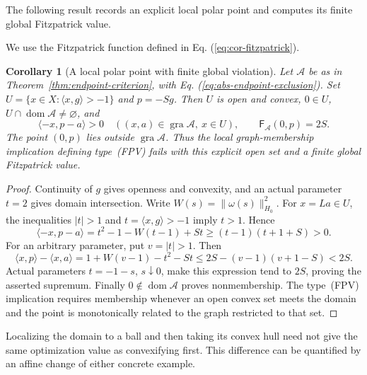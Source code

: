\documentclass[11pt]{article}
\newcommand{\gra}{\operatorname{gra}}
\newcommand{\dom}{\operatorname{dom}}
\newcommand{\pair}[2]{\langle #1,#2\rangle}
\newtheorem{corollary}{Corollary}
\theoremstyle{definition}
\theoremstyle{remark}
\begin{document}
The following result records an explicit local polar point and computes its finite global Fitzpatrick value.

We use the Fitzpatrick function defined in Eq. (\ref{eq:cor-fitzpatrick}).

\begin{corollary}[A local polar point with finite global violation]
\label{cor:local-polar-recovered}
Let $\mathcal A$ be as in Theorem~\ref{thm:endpoint-criterion}, with Eq. (\ref{eq:abs-endpoint-exclusion}). Set $U=\{x\in X:\pair{x}{g}>-1\}$ and $p=-Sg$. Then $U$ is open and convex, $0\in U$, $U\cap\dom\mathcal A\ne\varnothing$, and
\[
\pair{-x}{p-a}>0\quad((x,a)\in\gra\mathcal A,\ x\in U),
\qquad \mathsf F_{\mathcal A}(0,p)=2S.
\]
The point $(0,p)$ lies outside $\gra\mathcal A$. Thus the local graph-membership implication defining type~(FPV) fails with this explicit open set and a finite global Fitzpatrick value.
\end{corollary}
\begin{proof}
Continuity of $g$ gives openness and convexity, and an actual parameter $t=2$ gives domain intersection. Write $W(s)=\|\omega(s)\|_{H_0}^2$. For $x=La\in U$, the inequalities $|t|>1$ and $t=\pair{x}{g}>-1$ imply $t>1$. Hence
\[
\pair{-x}{p-a}=t^2-1-W(t-1)+St
\ge(t-1)(t+1+S)>0.
\]
For an arbitrary parameter, put $v=|t|>1$. Then
\[
\pair{x}{p}-\pair{x}{a}
=1+W(v-1)-t^2-St
\le2S-(v-1)(v+1-S)<2S.
\]
Actual parameters $t=-1-s$, $s\downarrow0$, make this expression tend to $2S$, proving the asserted supremum. Finally $0\notin\dom\mathcal A$ proves nonmembership. The type~(FPV) implication requires membership whenever an open convex set meets the domain and the point is monotonically related to the graph restricted to that set.
\end{proof}

Localizing the domain to a ball and then taking its convex hull need not give the same optimization value as convexifying first. This difference can be quantified by an affine change of either concrete example.
\end{document}
